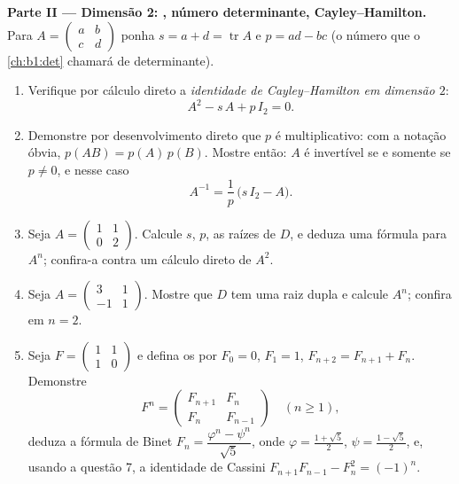 \begin{problem}
\medskip
\noindent\textbf{Parte II --- Dimensão 2: , número
determinante, Cayley--Hamilton.} Para $A = \begin{pmatrix} a & b\\ c &
d\end{pmatrix}$ ponha $s = a + d = \operatorname{tr} A$ e $p = ad
- bc$ (o
número que o \cref{ch:b1:det} chamará de determinante).
\begin{enumerate}[resume]
  \item Verifique por cálculo direto a \emph{identidade de
        Cayley--Hamilton em dimensão $2$}:
        \[
        A^2 - s\,A + p\,I_2 = 0 .
        \]
  \item Demonstre por desenvolvimento direto que $p$ é
        multiplicativo: com a notação óbvia, $p(AB) = p(A)\,p(B)$. Mostre então:
        $A$ é invertível se e somente se $p \neq 0$, e nesse caso
        \[
        A^{-1} = \frac1p\,\bigl(s\,I_2 - A\bigr).
        \]
  \item Seja $A = \begin{pmatrix} 1 & 1\\ 0 & 2\end{pmatrix}$. Calcule $s$, $p$, as raízes de $D$, e deduza
        uma fórmula  para $A^n$; confira-a contra um cálculo
        direto de $A^2$.
  \item Seja $A = \begin{pmatrix} 3 & 1\\ -1 & 1\end{pmatrix}$. Mostre que $D$ tem uma raiz dupla e calcule
        $A^n$; confira em $n = 2$.
  \item Seja $F = \begin{pmatrix} 1 & 1\\ 1 & 0\end{pmatrix}$ e defina os  por $F_0 = 0$,
        $F_1 = 1$, $F_{n+2} = F_{n+1} + F_n$. Demonstre
        \[
        F^n = \begin{pmatrix} F_{n+1} & F_n\\ F_n &
        F_{n-1}\end{pmatrix} \quad (n \geq 1),
        \]
        deduza a fórmula de Binet $F_n = \dfrac{\varphi^n -
        \psi^n}{\sqrt5}$, onde $\varphi = \frac{1 + \sqrt5}2$, $\psi = \frac{1 - \sqrt5}2$, e,
        usando a questão 7, a identidade de Cassini $F_{n+1}F_{n-1} - F_n^2 = (-1)^n$.
\end{enumerate}


\end{problem}

